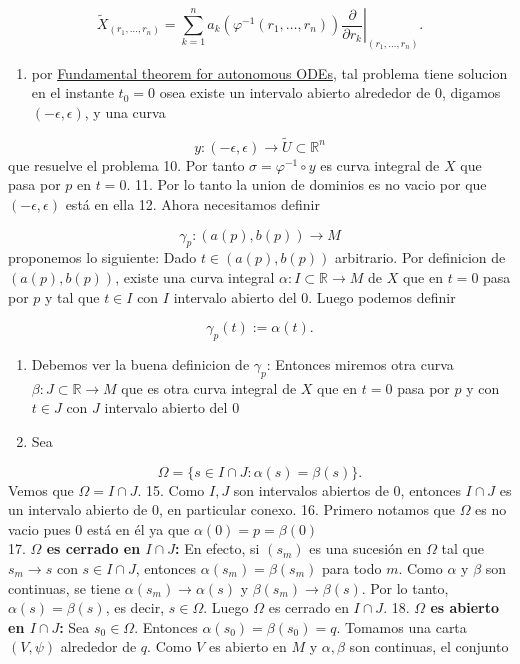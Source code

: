 \begin{bookproof}{}
\[
\widetilde X_{(r_1,\ldots,r_n)}=\sum_{k=1}^n a_k(\varphi^{-1}(r_1,\ldots,r_n))\left.\frac{\partial}{\partial r_k}\right|_{(r_1,\ldots,r_n)}.
\]
\begin{enumerate}[start=9]
\item por \hyperref[blk:81ef7e]{Fundamental theorem for autonomous ODEs}, tal problema tiene solucion en el instante $t_0=0$ osea existe un intervalo abierto alrededor de $0$, digamos $(-\epsilon,\epsilon)$, y una curva
\end{enumerate}
\[
y:(-\epsilon,\epsilon)\to \widetilde{U}\subset\mathbb R^n
\]
que resuelve el problema 10. Por tanto $\sigma=\varphi^{-1}\circ y$ es curva integral de $X$ que pasa por $p$ en $t=0$. 11. Por lo tanto la union de dominios es no vacio por que $(-\epsilon,\epsilon)$ está en ella 12. Ahora necesitamos definir

\[
\gamma_p:(a(p),b(p))\to M
\]
proponemos lo siguiente: Dado $t\in(a(p),b(p))$ arbitrario. Por definicion de $(a(p),b(p))$, existe una curva integral $\alpha:I\subset\mathbb R\to M$ de $X$ que en $t=0$ pasa por $p$ y tal que $t\in I$ con $I$ intervalo abierto del $0$. Luego podemos definir

\[
\gamma_p(t):=\alpha(t).
\]
\begin{enumerate}[start=13]
\item Debemos ver la buena definicion de $\gamma_p$: Entonces miremos otra curva $\beta:J\subset\mathbb R\to M$ que es otra curva integral de $X$ que en $t=0$ pasa por $p$ y con $t\in J$ con $J$ intervalo abierto del $0$
\item Sea
\end{enumerate}
\[
\Omega=\{s\in I\cap J:\alpha(s)=\beta(s)\}.
\]
Vemos que $\Omega=I\cap J$. 15. Como $I,J$ son intervalos abiertos de $0$, entonces $I\cap J$ es un intervalo abierto de $0$, en particular conexo. 16. Primero notamos que $\Omega$ es no vacio pues $0$ está en él ya que $\alpha (0)=p=\beta(0)$\\
17. \textbf{$\Omega$ es cerrado en $I\cap J$:} En efecto, si $(s_m)$ es una sucesión en $\Omega$ tal que $s_m\to s$ con $s\in I\cap J$, entonces $\alpha(s_m)=\beta(s_m)$ para todo $m$. Como $\alpha$ y $\beta$ son continuas, se tiene $\alpha(s_m)\to\alpha(s)$ y $\beta(s_m)\to\beta(s)$. Por lo tanto, $\alpha(s)=\beta(s)$, es decir, $s\in\Omega$. Luego $\Omega$ es cerrado en $I\cap J$. 18. \textbf{$\Omega$ es abierto en $I\cap J$:} Sea $s_0\in\Omega$. Entonces $\alpha(s_0)=\beta(s_0)=q$. Tomamos una carta $(V,\psi)$ alrededor de $q$. Como $V$ es abierto en $M$ y $\alpha,\beta$ son continuas, el conjunto


\end{bookproof}
